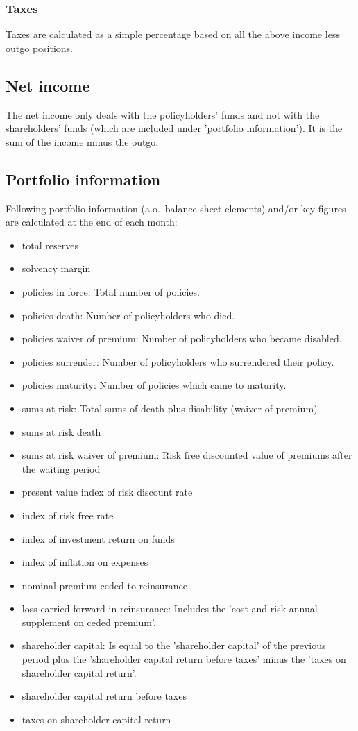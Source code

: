 \subsubsection{Taxes}
Taxes are calculated as a simple percentage based on all the above income less outgo positions.

\subsection{Net income}
The net income only deals with the policyholders' funds and not with the shareholders' funds (which are included under 'portfolio information'). It is the sum of the income minus the outgo.

\subsection{Portfolio information}
Following portfolio information (a.o.~balance sheet elements) and/or key figures are calculated at the end of each month:
\begin{itemize}
	\item total reserves
	\item solvency margin
	\item policies in force: Total number of policies.
	\item policies death: Number of policyholders who died.
	\item policies waiver of premium: Number of policyholders who became disabled.
	\item policies surrender: Number of policyholders who surrendered their policy.
	\item policies maturity: Number of policies which came to maturity.
	\item sums at risk: Total sums of death plus disability (waiver of premium)
	\item sums at risk death
	\item sums at risk waiver of premium: Risk free discounted value of premiums after the waiting period
	\item present value index of risk discount rate
	\item index of risk free rate
	\item index of investment return on funds
	\item index of inflation on expenses
	\item nominal premium ceded to reinsurance
	\item loss carried forward in reinsurance: Includes the 'cost and risk annual supplement on ceded premium'.
	\item shareholder capital: Is equal to the 'shareholder capital' of the previous period plus the 'shareholder capital return before taxes' minus the 'taxes on shareholder capital return'.
	\item shareholder capital return before taxes
	\item taxes on shareholder capital return
\end{itemize}

